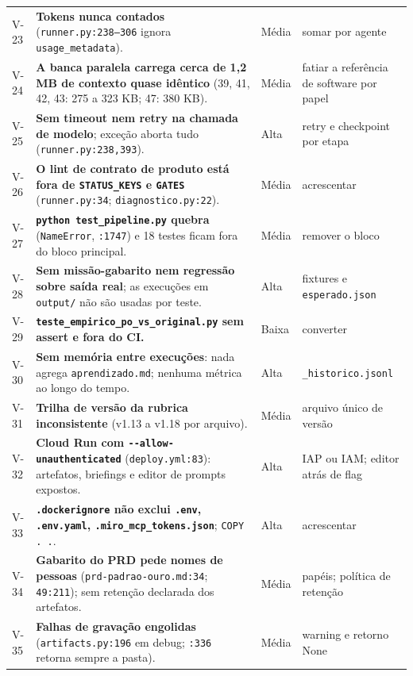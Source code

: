 \documentclass[11pt,a4paper]{article}
\begin{document}
\begin{longtable}{@{}p{0.9cm} >{\raggedright\arraybackslash}p{8.6cm} p{1.1cm} >{\raggedright\arraybackslash}p{4.9cm}@{}}
V-23 & \textbf{Tokens nunca contados} (\texttt{runner.py:238--306} ignora \texttt{usage\_metadata}). & Média & somar por agente \\
V-24 & \textbf{A banca paralela carrega cerca de 1,2 MB de contexto quase idêntico} (39, 41, 42, 43: 275 a 323 KB; 47: 380 KB). & Média & fatiar a referência de software por papel \\
V-25 & \textbf{Sem timeout nem retry na chamada de modelo}; exceção aborta tudo (\texttt{runner.py:238,393}). & Alta & retry e checkpoint por etapa \\
V-26 & \textbf{O lint de contrato de produto está fora de \texttt{STATUS\_KEYS} e \texttt{GATES}} (\texttt{runner.py:34}; \texttt{diagnostico.py:22}). & Média & acrescentar \\
V-27 & \textbf{\texttt{python test\_pipeline.py} quebra} (\texttt{NameError}, \texttt{:1747}) e 18 testes ficam fora do bloco principal. & Média & remover o bloco \\
V-28 & \textbf{Sem missão-gabarito nem regressão sobre saída real}; as execuções em \texttt{output/} não são usadas por teste. & Alta & fixtures e \texttt{esperado.json} \\
V-29 & \textbf{\texttt{teste\_empirico\_po\_vs\_original.py} sem assert e fora do CI.} & Baixa & converter \\
V-30 & \textbf{Sem memória entre execuções}: nada agrega \texttt{aprendizado.md}; nenhuma métrica ao longo do tempo. & Alta & \texttt{\_historico.jsonl} \\
V-31 & \textbf{Trilha de versão da rubrica inconsistente} (v1.13 a v1.18 por arquivo). & Média & arquivo único de versão \\
V-32 & \textbf{Cloud Run com \texttt{-{}-allow-unauthenticated}} (\texttt{deploy.yml:83}): artefatos, briefings e editor de prompts expostos. & Alta & IAP ou IAM; editor atrás de flag \\
V-33 & \textbf{\texttt{.dockerignore} não exclui \texttt{.env}, \texttt{.env.yaml}, \texttt{.miro\_mcp\_tokens.json}}; \texttt{COPY . .}. & Alta & acrescentar \\
V-34 & \textbf{Gabarito do PRD pede nomes de pessoas} (\texttt{prd-padrao-ouro.md:34}; \texttt{49:211}); sem retenção declarada dos artefatos. & Média & papéis; política de retenção \\
V-35 & \textbf{Falhas de gravação engolidas} (\texttt{artifacts.py:196} em debug; \texttt{:336} retorna sempre a pasta). & Média & warning e retorno None \\
\end{longtable}
\normalsize
\end{document}
